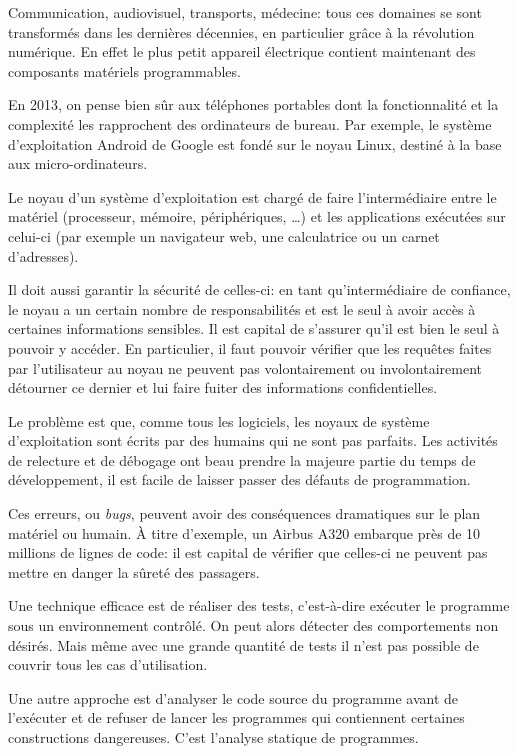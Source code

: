Communication,
audiovisuel,
transports,
médecine:
tous ces domaines se sont transformés dans les dernières décennies,
en particulier grâce à la révolution numérique.
En effet le plus petit appareil électrique contient maintenant des composants
matériels programmables.

En 2013, on pense bien sûr aux téléphones portables dont la fonctionnalité et la
complexité les rapprochent des ordinateurs de bureau. Par exemple, le système
d'exploitation Android de Google est fondé sur le noyau Linux, destiné à la base
aux micro-ordinateurs.

Le noyau d'un système d'exploitation est chargé de faire l'intermédiaire entre
le matériel (processeur, mémoire, périphériques, …) et les applications
exécutées sur celui-ci (par exemple un navigateur web, une calculatrice ou un
carnet d'adresses).

Il doit aussi garantir la sécurité de celles-ci: en tant qu'intermédiaire de
confiance, le noyau a un certain nombre de responsabilités et est le seul à
avoir accès à certaines informations sensibles. Il est capital de s'assurer
qu'il est bien le seul à pouvoir y accéder. En particulier, il faut pouvoir
vérifier que les requêtes faites par l'utilisateur au noyau ne peuvent pas
volontairement ou involontairement détourner ce dernier et lui faire fuiter des
informations confidentielles.

Le problème est que, comme tous les logiciels, les noyaux de système
d'exploitation sont écrits par des humains qui ne sont pas parfaits. Les
activités de relecture et de débogage ont beau prendre la majeure partie du
temps de développement, il est facile de laisser passer des défauts de
programmation.

Ces erreurs, ou \emph{bugs}, peuvent avoir des conséquences dramatiques sur le
plan matériel ou humain. À titre d'exemple, un Airbus A320 embarque près de 10
millions de lignes de code: il est capital de vérifier que celles-ci ne peuvent
pas mettre en danger la sûreté des passagers.

Une technique efficace est de réaliser des tests, c'est-à-dire exécuter le
programme sous un environnement contrôlé. On peut alors détecter des
comportements non désirés. Mais même avec une grande quantité de tests il n'est
pas possible de couvrir tous les cas d'utilisation.

Une autre approche est d'analyser le code source du programme avant de
l'exécuter et de refuser de lancer les programmes qui contiennent certaines
constructions dangereuses. C'est l'analyse statique de programmes.

